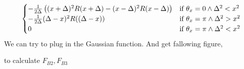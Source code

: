\documentclass[a4paper,12pt]{article}
\begin{document}
\begin{align}
\begin{cases}
                           - \frac{1}{2\Delta} \left((x + \Delta)^2 R(x + \Delta) - (x - \Delta)^2 R(x - \Delta)\right) & \text{if } \theta_x = 0 \wedge \Delta^2 < x^2 \\
                           - \frac{1}{2\Delta} (\Delta - x)^2 R((\Delta - x)) & \text{if } \theta_x = \pi \wedge \Delta^2 > x^2 \\
                           0 & \text{if } \theta_x = \pi \wedge \Delta^2 < x^2 \\
                       \end{cases} \notag \\
\end{align}
We can try to plug in the Gaussian function. And get fallowing figure,

to calculate \(F_{B2}, F_{B3}\)
\appendix

\acknowledgments






\end{document}

